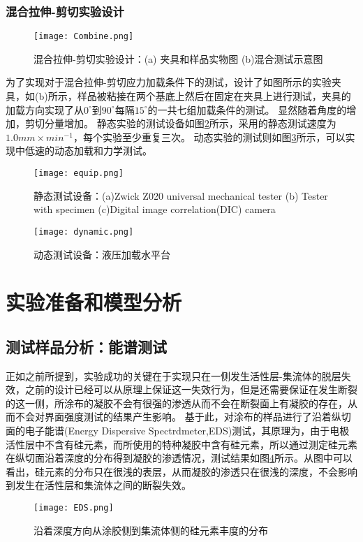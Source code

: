 \subsubsection{混合拉伸-剪切实验设计}
\begin{figure}
\centering   
\texttt{[image: Combine.png]}
\caption{混合拉伸-剪切实验设计：(a) 夹具和样品实物图 (b)混合测试示意图} 
\label{fig:combine}
\end{figure}
为了实现对于混合拉伸-剪切应力加载条件下的测试，设计了如图所示的实验夹具，如(b)所示，样品被粘接在两个基底上然后在固定在夹具上进行测试，夹具的加载方向实现了从$0^{\circ}$到$90^{\circ}$每隔$15^{\circ}$的一共七组加载条件的测试。 显然随着角度的增加，剪切分量增加。 静态实验的测试设备如图\ref{fig:equipment}所示，采用的静态测试速度为$1.0mm \times min^{-1}$，每个实验至少重复三次。 动态实验的测试则如图\ref{fig:dynamic}所示，可以实现中低速的动态加载和力学测试。
\begin{figure}
\centering   
\texttt{[image: equip.png]}
\caption{静态测试设备：(a)Zwick Z020 universal mechanical tester
(b) Tester with specimen (c)Digital image correlation(DIC) camera} 
\label{fig:equipment}
\end{figure}
\begin{figure}
\centering   
\texttt{[image: dynamic.png]}
\caption{动态测试设备：液压加载水平台} 
\label{fig:dynamic}
\end{figure}
\section{实验准备和模型分析}
\subsection{测试样品分析：能谱测试}
正如之前所提到，实验成功的关键在于实现只在一侧发生活性层-集流体的脱层失效，之前的设计已经可以从原理上保证这一失效行为，但是还需要保证在发生断裂的这一侧，所涂布的凝胶不会有很强的渗透从而不会在断裂面上有凝胶的存在，从而不会对界面强度测试的结果产生影响。 基于此，对涂布的样品进行了沿着纵切面的电子能谱(Energy Dispersive Spectrdmeter,EDS)测试，其原理为，由于电极活性层中不含有硅元素，而所使用的特种凝胶中含有硅元素，所以通过测定硅元素在纵切面沿着深度的分布得到凝胶的渗透情况，测试结果如图\ref{fig:eds}所示。从图中可以看出，硅元素的分布只在很浅的表层，从而凝胶的渗透只在很浅的深度，不会影响到发生在活性层和集流体之间的断裂失效。
\begin{figure}
\centering   
\texttt{[image: EDS.png]}
\caption{沿着深度方向从涂胶侧到集流体侧的硅元素丰度的分布} 
\label{fig:eds}
\end{figure}

